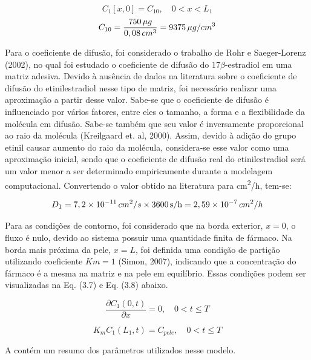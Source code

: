 \begin{equation}
C_1[x,0] = C_{10}, \quad 0 < x < L_1
\end{equation}
\begin{equation}
    C_{10} = \frac{750 \, \mu g}{0,08 \, cm\textsuperscript{3}} =  9375 \, \mu g/cm\textsuperscript{3}
\end{equation}

Para o coeficiente de difusão, foi considerado o trabalho de Rohr e Saeger‐Lorenz (2002), no qual foi estudado o coeficiente de difusão do $17\beta$-estradiol em uma matriz adesiva. Devido à ausência de dados na literatura sobre o coeficiente de difusão do etinilestradiol nesse tipo de matriz, foi necessário realizar uma aproximação a partir desse valor. Sabe-se que o coeficiente de difusão é influenciado por vários fatores, entre eles o tamanho, a forma e a flexibilidade da molécula em difusão. Sabe-se também que seu valor é inversamente proporcional ao raio da molécula (Kreilgaard et. al, 2000). Assim, devido à adição do grupo etinil causar aumento do raio da molécula, considera-se esse valor como uma aproximação inicial, sendo que o coeficiente de difusão real do etinilestradiol será um valor menor a ser determinado empiricamente durante a modelagem computacional. Convertendo o valor obtido na literatura para cm\textsuperscript{2}/h, tem-se:

\begin{equation}
    D_1 = 7,2 \times 10^{-11} \, cm\textsuperscript{2}/s \times 3600 \, \text{s/h} = 2,59 \times 10^{-7} \, cm\textsuperscript{2}/h
\end{equation}

Para as condições de contorno, foi considerado que na borda exterior, $x = 0$, o fluxo é nulo, devido ao sistema possuir uma quantidade finita de fármaco. Na borda mais próxima da pele, $x = L$, foi definida uma condição de partição utilizando coeficiente $Km = 1$ (Simon, 2007), indicando que a concentração do fármaco é a mesma na matriz e na pele em equilíbrio. Essas condições podem ser visualizadas na Eq. (3.7) e Eq. (3.8) abaixo.

\begin{equation}
\frac{\partial C_1(0,t)}{\partial x} = 0, \quad 0 < t \leq T
\end{equation}

\begin{equation}
K_m C_1(L_1,t) = C_{pele}, \quad 0 < t \leq T
\end{equation}

A  contém um resumo dos parâmetros utilizados nesse modelo.

